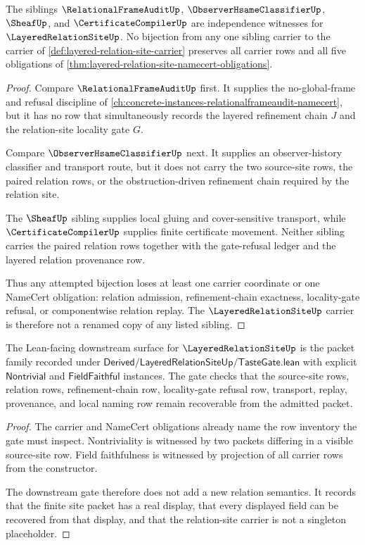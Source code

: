 \begin{theorem}
\label{thm:layered-relation-site-independence-boundary}
The siblings $\RelationalFrameAuditUp$, $\ObserverHsameClassifierUp$, $\SheafUp$, and $\CertificateCompilerUp$ are independence witnesses for $\LayeredRelationSiteUp$. No bijection from any one sibling carrier to the carrier of \autoref{def:layered-relation-site-carrier} preserves all carrier rows and all five obligations of \autoref{thm:layered-relation-site-namecert-obligations}.
\end{theorem}
\begin{proof}
Compare $\RelationalFrameAuditUp$ first. It supplies the no-global-frame and refusal discipline of \autoref{ch:concrete-instances-relationalframeaudit-namecert}, but it has no row that simultaneously records the layered refinement chain $J$ and the relation-site locality gate $G$.

Compare $\ObserverHsameClassifierUp$ next. It supplies an observer-history classifier and transport route, but it does not carry the two source-site rows, the paired relation rows, or the obstruction-driven refinement chain required by the relation site.

The $\SheafUp$ sibling supplies local gluing and cover-sensitive transport, while $\CertificateCompilerUp$ supplies finite certificate movement. Neither sibling carries the paired relation rows together with the gate-refusal ledger and the layered relation provenance row.

Thus any attempted bijection loses at least one carrier coordinate or one NameCert obligation: relation admission, refinement-chain exactness, locality-gate refusal, or componentwise relation replay. The $\LayeredRelationSiteUp$ carrier is therefore not a renamed copy of any listed sibling.
\end{proof}

\begin{theorem}
\label{thm:layered-relation-site-downstream-gate-target}
The Lean-facing downstream surface for $\LayeredRelationSiteUp$ is the packet family recorded under $\mathsf{Derived/LayeredRelationSiteUp/TasteGate.lean}$ with explicit $\mathsf{Nontrivial}$ and $\mathsf{FieldFaithful}$ instances. The gate checks that the source-site rows, relation rows, refinement-chain row, locality-gate refusal row, transport, replay, provenance, and local naming row remain recoverable from the admitted packet.
\end{theorem}
\begin{proof}
The carrier and NameCert obligations already name the row inventory the gate must inspect. Nontriviality is witnessed by two packets differing in a visible source-site row. Field faithfulness is witnessed by projection of all carrier rows from the constructor.

The downstream gate therefore does not add a new relation semantics. It records that the finite site packet has a real display, that every displayed field can be recovered from that display, and that the relation-site carrier is not a singleton placeholder.
\end{proof}

